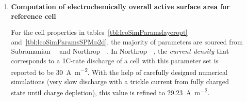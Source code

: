 \begin{enumerate}[ label=\textbf{\arabic*}), leftmargin=0pt, itemindent=20pt, labelwidth=15pt, labelsep=5pt, listparindent=0.7cm, align=left]
\begin{itemize}[ leftmargin=10pt, itemindent=15pt, labelwidth=5pt, labelsep=5pt, listparindent=0.7cm, align=left]
                In  this  layer  optimisation work,  following  the  assumptions
                of    \cref{subsec:layeroptassumptions},   the    overall   pack
                configuration remains  unchanged \ie{} independent of  number of
                layers  within the  pouch.  This implies  that the  undervoltage
                threshold  for  DC  bus   voltage  throughout  this  work  shall
                remain  fixed  at  \SI{336}{\volt}.  Therefore,  with  96~series
                connected cells  in a string,  the lower cut-off voltage  for an
                individual  cell  is  \textbf{\SI{3.5}{\volt}}.  This  value  is
                reported  in \cref{tbl:lcoSimParamslayeropt}  and is  used as  a
                termination  condition  for  all  simulations  as  explained  in
                \cref{sec:layeroptframework}.

        \end{itemize}

    \item \textbf{Computation of electrochemically overall active surface area for reference cell}

        For   the  cell   properties  in   tables~\ref{tbl:lcoSimParamslayeropt}
        and~\ref{tbl:lcoSimParamsSPMp2d},    the    majority    of    parameters
        are      sourced      from      Subramanian~\etal~\cite{Subramanian2009}
        and                Northrop~\etal~\cite{Northrop2011}.                In
        Northrop~\etal~\cite{Northrop2011},  the   \emph{current  density}  that
        corresponds to a 1C-rate discharge of  a cell with this parameter set is
        reported to be \approx \SI{30}{\ampere\per\meter\squared}. With the help
        of carefully designed numerical simulations  (very slow discharge with a
        trickle current from  fully charged state until  charge depletion), this
        value is refined to \SI{29.23}{\ampere\per\meter\squared}.


\end{enumerate}

